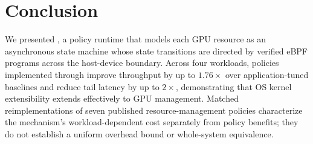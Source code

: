 \section{Conclusion}
\label{sec:conclusion}
We presented \sys, a policy runtime that models each GPU resource as an asynchronous state machine whose state transitions are directed by verified eBPF programs across the host-device boundary.
Across four workloads, policies implemented through \sys improve throughput by up to $1.76\times$ over application-tuned baselines and reduce tail latency by up to $2\times$, demonstrating that OS kernel extensibility extends effectively to GPU management.
Matched reimplementations of seven published resource-management policies characterize the mechanism's workload-dependent cost separately from policy benefits; they do not establish a uniform overhead bound or whole-system equivalence.

